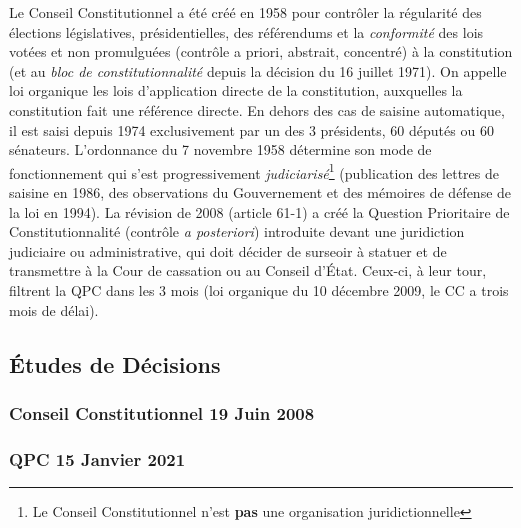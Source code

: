 \documentclass[math]{cours}
\begin{document}
Le Conseil Constitutionnel a été créé en 1958 pour contrôler la régularité des élections législatives, présidentielles, des référendums et la \emph{conformité} des lois votées et non promulguées (contrôle a priori, abstrait, concentré) à la constitution (et au \emph{bloc de constitutionnalité} depuis la décision du 16 juillet 1971).
On appelle loi organique les lois d'application directe de la constitution, auxquelles la constitution fait une référence directe.
En dehors des cas de saisine automatique, il est saisi depuis 1974 exclusivement par un des 3 présidents, 60 députés ou 60 sénateurs.
L'ordonnance du 7 novembre 1958 détermine son mode de fonctionnement qui s'est progressivement \emph{judiciarisé}\footnote{Le Conseil Constitutionnel n'est \textbf{pas} une organisation juridictionnelle} (publication des lettres de saisine en 1986, des observations du Gouvernement et des mémoires de défense de la loi en 1994).
La révision de 2008 (article 61-1) a créé la Question Prioritaire de Constitutionnalité (contrôle \emph{a posteriori}) introduite devant une juridiction judiciaire ou administrative, qui doit décider de surseoir à statuer et de transmettre à la Cour de cassation ou au Conseil d'État.
Ceux-ci, à leur tour, filtrent la QPC dans les 3 mois (loi organique du 10 décembre 2009, le CC a trois mois de délai).

\subsection{Études de Décisions}
\subsubsection{Conseil Constitutionnel 19 Juin 2008}
\cite{CConst19062008}

\subsubsection{QPC 15 Janvier 2021}
\cite{QPC15012021}
\end{document}
